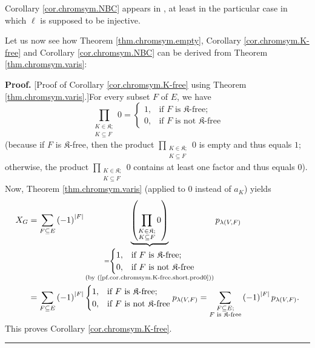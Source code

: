 \documentclass[numbers=enddot,12pt,final,onecolumn,notitlepage]{scrartcl}%
\theoremstyle{definition}
\newenvironment{proof}[1][Proof]{\noindent\textbf{#1.} }{\ \rule{0.5em}{0.5em}}
\newenvironment{vershort}{}{}
\let\sumnonlimits\sum
\let\prodnonlimits\prod
\renewcommand{\sum}{\sumnonlimits\limits}
\renewcommand{\prod}{\prodnonlimits\limits}
\begin{document}
Corollary \ref{cor.chromsym.NBC} appears in \cite[Theorem 2.9]{Stanley-chsym},
at least in the particular case in which $\ell$ is supposed to be injective.

Let us now see how Theorem \ref{thm.chromsym.empty}, Corollary
\ref{cor.chromsym.K-free} and Corollary \ref{cor.chromsym.NBC} can be derived
from Theorem \ref{thm.chromsym.varis}:

\begin{vershort}
\begin{proof}
[Proof of Corollary \ref{cor.chromsym.K-free} using Theorem
\ref{thm.chromsym.varis}.]For every subset $F$ of $E$, we have%
\begin{equation}
\prod_{\substack{K\in\mathfrak{K};\\K\subseteq F}}0=%
\begin{cases}
1, & \text{if }F\text{ is }\mathfrak{K}\text{-free;}\\
0, & \text{if }F\text{ is not }\mathfrak{K}\text{-free}%
\end{cases}
\label{pf.cor.chromsym.K-free.short.prod0}%
\end{equation}
(because if $F$ is $\mathfrak{K}$-free, then the product $\prod
_{\substack{K\in\mathfrak{K};\\K\subseteq F}}0$ is empty and thus equals $1$;
otherwise, the product $\prod_{\substack{K\in\mathfrak{K};\\K\subseteq F}}0$
contains at least one factor and thus equals $0$). Now, Theorem
\ref{thm.chromsym.varis} (applied to $0$ instead of $a_{K}$) yields%
\begin{align*}
X_{G}  &  =\sum_{F\subseteq E}\left(  -1\right)  ^{\left\vert F\right\vert
}\underbrace{\left(  \prod_{\substack{K\in\mathfrak{K};\\K\subseteq
F}}0\right)  }_{\substack{=%
\begin{cases}
1, & \text{if }F\text{ is }\mathfrak{K}\text{-free;}\\
0, & \text{if }F\text{ is not }\mathfrak{K}\text{-free}%
\end{cases}
\\\text{(by (\ref{pf.cor.chromsym.K-free.short.prod0}))}}}p_{\lambda\left(
V,F\right)  }\\
&  =\sum_{F\subseteq E}\left(  -1\right)  ^{\left\vert F\right\vert }%
\begin{cases}
1, & \text{if }F\text{ is }\mathfrak{K}\text{-free;}\\
0, & \text{if }F\text{ is not }\mathfrak{K}\text{-free}%
\end{cases}
p_{\lambda\left(  V,F\right)  }=\sum_{\substack{F\subseteq E;\\F\text{ is
}\mathfrak{K}\text{-free}}}\left(  -1\right)  ^{\left\vert F\right\vert
}p_{\lambda\left(  V,F\right)  }.
\end{align*}
This proves Corollary \ref{cor.chromsym.K-free}.
\end{proof}
\end{vershort}
\end{document}
